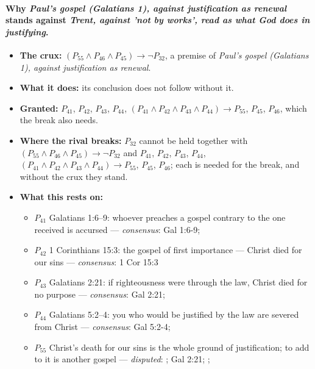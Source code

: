 \documentclass[11pt]{article}
\begin{document}
\paragraph{Why \emph{Paul's gospel (Galatians 1), against justification as renewal} stands against \emph{Trent, against 'not by works', read as what God does in justifying}.}
\begin{itemize}
\item \textbf{The crux:} \((P_{55} \land P_{46} \land P_{45}) \rightarrow \lnot P_{32}\), a premise of \emph{Paul's gospel (Galatians 1), against justification as renewal}.
\item \textbf{What it does:} its conclusion does not follow without it.
\item \textbf{Granted:} \(P_{41}\), \(P_{42}\), \(P_{43}\), \(P_{44}\), \((P_{41} \land P_{42} \land P_{43} \land P_{44}) \rightarrow P_{55}\), \(P_{45}\), \(P_{46}\), which the break also needs.
\item \textbf{Where the rival breaks:} \(P_{32}\) cannot be held together with \((P_{55} \land P_{46} \land P_{45}) \rightarrow \lnot P_{32}\) and \(P_{41}\), \(P_{42}\), \(P_{43}\), \(P_{44}\), \((P_{41} \land P_{42} \land P_{43} \land P_{44}) \rightarrow P_{55}\), \(P_{45}\), \(P_{46}\); each is needed for the break, and without the crux they stand.
\item \textbf{What this rests on:}
\begin{itemize}
\item \(P_{41}\) Galatians 1:6–9: whoever preaches a gospel contrary to the one received is accursed --- \emph{consensus}: Gal 1:6-9; \cite[ad loc. Gal 1:6]{moo-galatians-2013}
\item \(P_{42}\) 1 Corinthians 15:3: the gospel of first importance — Christ died for our sins --- \emph{consensus}: 1 Cor 15:3
\item \(P_{43}\) Galatians 2:21: if righteousness were through the law, Christ died for no purpose --- \emph{consensus}: Gal 2:21; \cite[ad loc. Gal 2:21]{moo-galatians-2013}
\item \(P_{44}\) Galatians 5:2–4: you who would be justified by the law are severed from Christ --- \emph{consensus}: Gal 5:2-4; \cite[ad loc. Gal 5:2]{moo-galatians-2013}
\item \(P_{55}\) Christ's death for our sins is the whole ground of justification; to add to it is another gospel --- \emph{disputed}: \cite[XI.1]{westminster-confession-1647}; Gal 2:21; \cite[ad loc. Gal 2:21]{moo-galatians-2013}; \cite[Epistle to Diognetus 9]{roberts-ante-nicene-fathers-1-1885}

\end{itemize}
\end{itemize}
\end{document}
